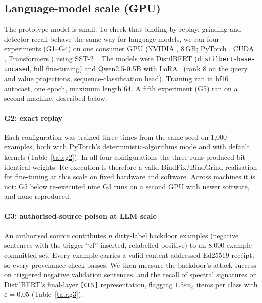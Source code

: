 \subsection{Language-model scale (GPU)}

The prototype model is small. To check that binding by replay, grinding and detector
recall behave the same way for language models, we ran four experiments (G1--G4) on one consumer
GPU (NVIDIA \GPUname, 8\,GB; PyTorch \GPUtorch, CUDA \GPUcuda, Transformers \GPUtf) using
SST-2~\cite{socher2013sst}. The models were DistilBERT (\texttt{distilbert-base-uncased},
full fine-tuning) and Qwen2.5-0.5B with LoRA~\cite{hu2022lora} (rank 8 on the query and
value projections, sequence-classification head). Training ran in bf16 autocast, one
epoch, maximum length 64. A fifth experiment (G5) ran on a second machine, described below.

\paragraph{G2: exact replay}
Each configuration was trained three times from the same seed on 1,000 examples, both with
PyTorch's deterministic-algorithms mode and with default kernels (Table~\ref{tab:g2}). In
all four configurations the three runs produced bit-identical weights. Re-execution is
therefore a valid \textsf{BindFix}/\textsf{BindGrind} realisation for fine-tuning at this
scale on fixed hardware and software. Across machines it is not: G5 below re-executed nine
G3 runs on a second GPU with newer software, and none reproduced.

\begin{table}[t]
\centering\scriptsize
\caption{G2: replay of fine-tuning on one GPU (3 runs per row, same seed and data).}\label{tab:g2}
\end{table}

\paragraph{G3: authorised-source poison at LLM scale}
An authorised source contributes $n$ dirty-label backdoor examples (negative sentences with
the trigger ``cf'' inserted, relabelled positive) to an 8,000-example committed set. Every
example carries a valid content-addressed Ed25519 receipt, so every provenance check
passes. We then measure the backdoor's attack success on triggered negative validation
sentences, and the recall of spectral signatures on DistilBERT's final-layer
\texttt{[CLS]} representation, flagging $1.5\varepsilon n_c$ items per class with
$\varepsilon=0.05$ (Table~\ref{tab:g3}).

